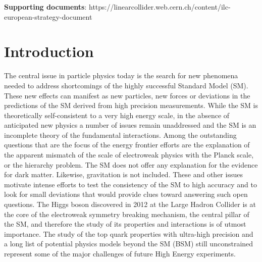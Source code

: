 \documentclass[%
 reprint,
 amsmath,amssymb,
 aps,
]{revtex4-1}
\newcommand{\todo}[1]{\textcolor{red}{{#1}}}
\begin{document}
\maketitle
\onecolumngrid
\textbf{Supporting documents}: https://linearcollider.web.cern.ch/content/ilc-european-strategy-document
\vspace{1cm}
\twocolumngrid



\section{\label{sec:intro}Introduction}


The central issue in particle physics today is the search for new phenomena needed to address shortcomings of the highly successful Standard Model (SM).  These new effects can manifest as new particles, new forces or deviations in the predictions of the SM derived from high precision measurements. While the SM is theoretically self-consistent to a very high energy scale, in the absence of anticipated new physics a number of issues remain unaddressed and the SM is an incomplete theory of the fundamental interactions. Among the outstanding questions that are the focus of the energy frontier efforts are the explanation of the apparent mismatch of the scale of electroweak physics with the Planck scale, or the hierarchy problem. The SM does not offer any explanation for the evidence for dark matter. Likewise, gravitation is not included.  These and other issues motivate intense efforts to test the consistency of the SM to high accuracy and to look for small deviations that would provide clues toward answering such open questions. The Higgs boson discovered in 2012 at the Large Hadron Collider is at the core of the electroweak symmetry breaking mechanism, the central pillar of the SM, and therefore the study of its properties and interactions is of utmost importance. The study of the top quark properties with ultra-high precision and a long list of potential physics models beyond the SM (BSM) still unconstrained represent some of the major challenges of future High Energy experiments.
\end{document}
